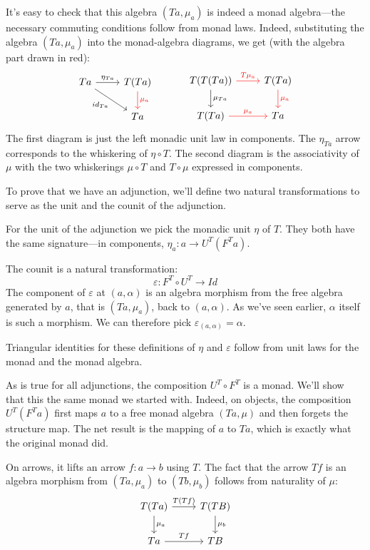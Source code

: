 \documentclass[DaoFP]{subfiles}
\begin{document}
It's easy to check that this algebra $(T a, \mu_a)$ is indeed a monad algebra---the necessary commuting conditions follow from monad laws. Indeed, substituting the algebra $(T a, \mu_a)$ into the monad-algebra diagrams, we get (with the algebra part drawn in red):
\[
 \begin{tikzcd}
 T a
 \arrow[r, "\eta_{T a}"]
 \arrow[dr, "id_{T a}"']
 & T(T a)
 \arrow[d, red, "\mu_a"]
 \\
 & T a
 \end{tikzcd}
  \hspace{30pt}
 \begin{tikzcd}
T(T(T a))
\arrow[r, red, "T \mu_a "]
\arrow[d, "\mu_{T a}"]
&T(T a)
\arrow[d, red, "\mu_a"]
\\
T (T a)
\arrow[r, red, "\mu_a"]
& T a
 \end{tikzcd}
\]
The first diagram is just the left monadic unit law in components. The $\eta_{T a}$ arrow corresponds to the whiskering of $\eta \circ T$. The second diagram is the associativity of $\mu$ with the two whiskerings $\mu \circ T$ and $T \circ \mu$ expressed in components.


To prove that we have an adjunction, we'll define two natural transformations to serve as the unit and the counit of the adjunction. 

For the unit of the adjunction we pick the monadic unit $\eta$ of $T$. They both have the same signature---in components, $\eta_a \colon a \to U^T (F^T a)$.

The counit is a natural transformation:
\[ \varepsilon \colon F^T \circ U^T \to Id \]
The component of $\varepsilon$ at $(a, \alpha)$ is an algebra morphism from the free algebra generated by $a$, that is $(T a, \mu_a)$, back to $(a, \alpha)$. As we've seen earlier, $\alpha$ itself is such a morphism. We can therefore pick $\varepsilon_{(a, \alpha)} = \alpha$.

Triangular identities for these definitions of $\eta$ and $\varepsilon$ follow from unit laws for the monad and the monad algebra.


As is true for all adjunctions, the composition $U^T \circ F^T$ is a monad. We'll show that this the same monad we started with. Indeed, on objects, the composition $U^T (F^T a)$ first maps $a$ to a free monad algebra $(T a, \mu)$ and then forgets the structure map. The net result is the mapping of $a$ to $T a$, which is exactly what the original monad did. 

On arrows, it lifts an arrow $f \colon a \to b$ using $T$. The fact that the arrow $T f$ is an algebra morphism from $(T a, \mu_a)$ to $(T b, \mu_b)$ follows from naturality of $\mu$:
\[
 \begin{tikzcd}
 T (T a)
 \arrow[r, "T( T f)"]
 \arrow[d, "\mu_a"]
 & T (T B)
\arrow[d, "\mu_b"]
 \\
 T a
 \arrow[r, "T f"]
 & T B
  \end{tikzcd}
\]
\end{document}
